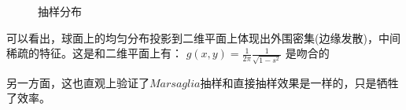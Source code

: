 \documentclass[UTF8]{ctexart}
\begin{document}
	\begin{figure}[H]
		\centering  %
		\caption{抽样分布}
		\label{N}
	\end{figure}
	
	
	\begin{flushleft}
		可以看出，球面上的均匀分布投影到二维平面上体现出外围密集(边缘发散)，中间稀疏的特征。这是和二维平面上有：
	$g(x,y)=\frac{1}{2\pi}\frac{1}{\sqrt{1-s^2}}$
	是吻合的

	另一方面，这也直观上验证了$Marsaglia$抽样和直接抽样效果是一样的，只是牺牲了效率。
	
	\end{flushleft}
	\clearpage
\end{document}
